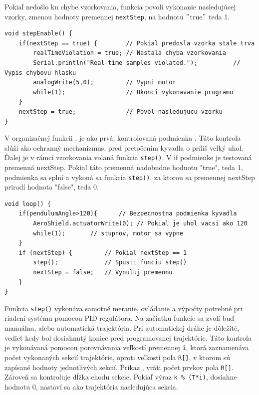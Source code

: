 Pokiaľ nedošlo ku chybe vzorkovania, funkcia povolí vykonanie nasledujúcej vzorky, zmenou hodnoty premennej \verb|nextStep|, na hodnotu $"$true$"$ teda 1. 

\begin{lstlisting}[caption={Funkcia stepEnable().},captionpos=b]
void stepEnable() {                          
	if(nextStep == true) {        // Pokial predosla vzorka stale trva
		realTimeViolation = true; // Nastala chyba vzorkovania
		Serial.println("Real-time samples violated."); 			// Vypis chybovu hlasku
		analogWrite(5,0);         // Vypni motor 
		while(1);                 // Ukonci vykonavanie programu
	}
	nextStep = true;              // Povol nasledujucu vzorku
}
\end{lstlisting}

V organizačnej funkcii , je ako prvá, kontrolovaná podmienka . Táto kontrola slúži ako ochranný mechanizmus, pred pretočením kyvadla o príliš veľký uhol. Ďalej je v rámci vzorkovania volaná funkcia \verb|step()|. V if podmienke je testovaná premenná nextStep. Pokiaľ táto premenná nadobudne hodnotu "true", teda 1, podmienka sa splní a vykoná sa funkcia \verb|step()|, za ktorou sa premennej nextStep priradí hodnota "false", teda 0.

\begin{lstlisting}[caption={Organzačná funkcia loop.},captionpos=b]
void loop() {
	if(pendulumAngle>120){		// Bezpecnostna podmienka kyvadla 
		AeroShield.actuatorWrite(0); // Pokial je uhol vacsi ako 120
		while(1);		// stupnov, motor sa vypne
	} 
	if (nextStep) {         // Pokial nextStep == 1
		step();             // Spusti funciu step()
		nextStep = false;   // Vynuluj premennu 
	}
}
\end{lstlisting}

Funkcia \verb|step()| vykonáva samotné meranie, ovládanie a výpočty potrebné pri riadení systému pomocou PID regulátora. Na začiatku funkcie sa zvolí buď manuálna, alebo automatická trajektória. Pri automatickej dráhe je dôležité, vedieť kedy bol dosiahnutý koniec pred programovanej trajektórie. Táto kontrola je vykonávaná pomocou porovnávania veľkostí premennej \verb|i|, ktorá zaznamenáva počet vykonaných sekcií trajektórie, oproti veľkosti pola \verb|R[]|, v ktorom sú zapísané hodnoty jednotlivých sekcií. Príkaz , vráti počet prvkov pola \verb|R[]|. Zároveň sa kontroluje dĺžka chodu sekcie. Pokiaľ výraz \verb|k % (T*i)|, dosiahne hodnotu 0, nastaví sa ako trajektória nasledujúca sekcia. 


